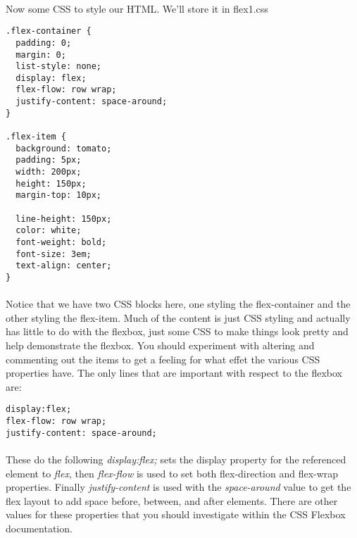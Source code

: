 \documentclass[10pt, a4paper]{article}
\begin{document}
\paragraph{} Now some CSS to style our HTML. We'll store it in flex1.css
\begin{lstlisting}
.flex-container {
  padding: 0;
  margin: 0;
  list-style: none;
  display: flex;
  flex-flow: row wrap;
  justify-content: space-around;
}

.flex-item {
  background: tomato;
  padding: 5px;
  width: 200px;
  height: 150px;
  margin-top: 10px;
  
  line-height: 150px;
  color: white;
  font-weight: bold;
  font-size: 3em;
  text-align: center;
}
\end{lstlisting}
\paragraph{} Notice that we have two CSS blocks here, one styling the flex-container and the other styling the flex-item. Much of the content is just CSS styling and actually has little to do with the flexbox, just some CSS to make things look pretty and help demonstrate the flexbox. You should experiment with altering and commenting out the items to get a feeling for what effet the various CSS properties have. The only lines that are important with respect to the flexbox are:

\begin{lstlisting}
display:flex;  
flex-flow: row wrap;
justify-content: space-around;
\end{lstlisting}
\paragraph{} These do the following \emph{display:flex;} sets the display property for the referenced element to \emph{flex}, then \emph{flex-flow} is used to set both flex-direction and flex-wrap properties. Finally \emph{justify-content} is used with the \emph{space-around} value to get the flex layout to add space before, between, and after elements. There are other values for these properties that you should investigate within the CSS Flexbox documentation.
\end{document}
